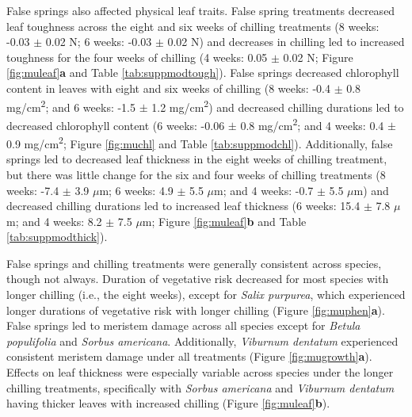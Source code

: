 \documentclass{article}\usepackage[]{graphicx}\usepackage[]{color}
\begin{document}
False springs also affected physical leaf traits. False spring treatments decreased leaf toughness across the eight and six weeks of chilling treatments (8 weeks: -0.03 $\pm$ 0.02 N; 6 weeks: -0.03 $\pm$ 0.02 N) and decreases in chilling led to increased toughness for the four weeks of chilling (4 weeks: 0.05 $\pm$ 0.02 N; Figure \ref{fig:muleaf}\textbf{a} and Table \ref{tab:suppmodtough}). False springs decreased chlorophyll content in leaves with eight and six weeks of chilling (8 weeks: -0.4 $\pm$ 0.8 mg/cm\textsuperscript{2}; and 6 weeks: -1.5 $\pm$ 1.2 mg/cm\textsuperscript{2}) and decreased chilling durations led to decreased chlorophyll content (6 weeks: -0.06 $\pm$ 0.8 mg/cm\textsuperscript{2}; and 4 weeks: 0.4 $\pm$ 0.9 mg/cm\textsuperscript{2}; Figure \ref{fig:muchl} and Table \ref{tab:suppmodchl}). Additionally, false springs led to decreased leaf thickness in the eight weeks of chilling treatment, but there was little change for the six and four weeks of chilling treatments (8 weeks: -7.4 $\pm$ 3.9 $\mu$m; 6 weeks: 4.9 $\pm$ 5.5 $\mu$m; and 4 weeks: -0.7 $\pm$ 5.5 $\mu$m) and decreased chilling durations led to increased leaf thickness (6 weeks: 15.4 $\pm$ 7.8 $\mu$m; and 4 weeks: 8.2 $\pm$ 7.5 $\mu$m; Figure \ref{fig:muleaf}\textbf{b} and Table \ref{tab:suppmodthick}). 
  
False springs and chilling treatments were generally consistent across species, though not always. Duration of vegetative risk decreased for most species with longer chilling (i.e., the eight weeks), except for \textit{Salix purpurea}, which experienced longer durations of vegetative risk with longer chilling (Figure \ref{fig:muphen}\textbf{a}). False springs led to meristem damage across all species except for \textit{Betula populifolia} and \textit{Sorbus americana}. Additionally, \textit{Viburnum dentatum} experienced consistent meristem damage under all treatments (Figure \ref{fig:mugrowth}\textbf{a}). Effects on leaf thickness were especially variable across species under the longer chilling treatments, specifically with \textit{Sorbus americana} and \textit{Viburnum dentatum} having thicker leaves with increased chilling (Figure \ref{fig:muleaf}\textbf{b}). 
  
\end{document}
